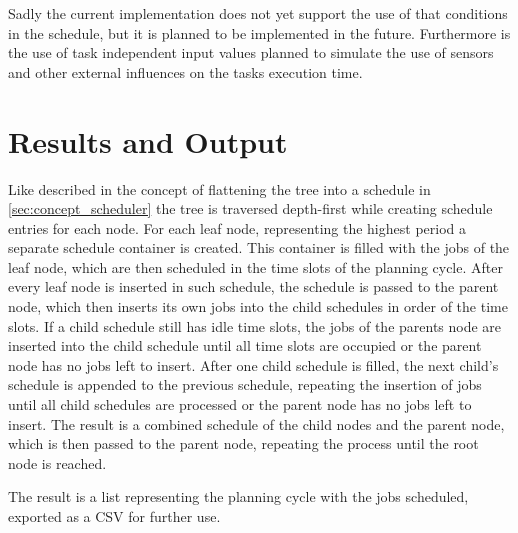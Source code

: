 Sadly the current implementation does not yet support the use of that conditions in the schedule, but it is planned to be implemented in the future.
Furthermore is the use of task independent input values planned to simulate the use of sensors and other external influences on the tasks execution time.


\section{Results and Output}\label{sec:creating-schedule}
Like described in the concept of flattening the tree into a schedule in \cref{sec:concept_scheduler} the tree is traversed depth-first while creating schedule entries for each node.
For each leaf node, representing the highest period a separate schedule container is created.
This container is filled with the jobs of the leaf node, which are then scheduled in the time slots of the planning cycle.
After every leaf node is inserted in such schedule, the schedule is passed to the parent node, which then inserts its own jobs into the child schedules in order of the time slots.
If a child schedule still has idle time slots, the jobs of the parents node are inserted into the child schedule until all time slots are occupied or the parent node has no jobs left to insert.
After one child schedule is filled, the next child's schedule is appended to the previous schedule, repeating the insertion of jobs until all child schedules are processed or the parent node has no jobs left to insert.
The result is a combined schedule of the child nodes and the parent node, which is then passed to the parent node, repeating the process until the root node is reached.

The result is a list representing the planning cycle with the jobs scheduled, exported as a CSV for further use.